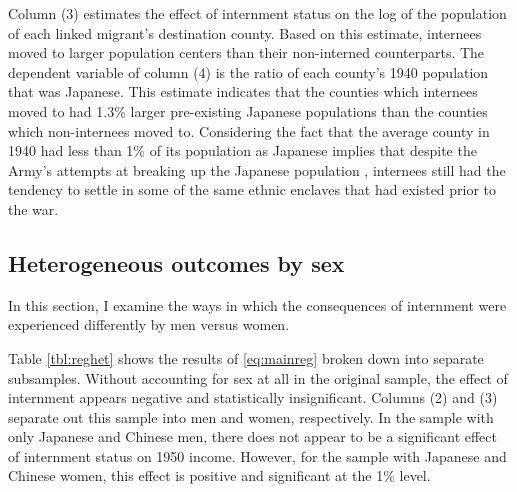 Column (3) estimates the effect of internment status on the log of the population
of each linked migrant's destination county.
Based on this estimate, internees moved to larger population centers
than their non-interned counterparts.
The dependent variable of column (4) is the ratio of each county's 1940
population that was Japanese.
This estimate indicates that the counties which internees moved to 
had 1.3\% larger pre-existing Japanese populations 
than the counties which non-internees moved to.
Considering the fact that the average county in 1940 
had less than 1\% of its population as Japanese implies that
despite the Army's attempts at breaking up the Japanese population
,
internees still had the tendency to settle 
in some of the same ethnic enclaves that had existed prior to the war.

\subsection{Heterogeneous outcomes by sex}

In this section, I examine the ways in which the consequences of internment
were experienced differently by men versus women.



% 

Table \ref{tbl:reghet} shows the results of \ref{eq:mainreg}
broken down into separate subsamples.
Without accounting for sex at all in the original sample,
the effect of internment appears negative and statistically insignificant.
Columns (2) and (3) separate out this sample into men and women, respectively.
In the sample with only Japanese and Chinese men, 
there does not appear to be a significant effect of internment status on 1950 income.
However, for the sample with Japanese and Chinese women,
this effect is positive and significant at the 1\% level.

